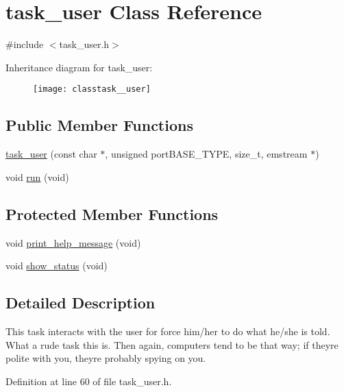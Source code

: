 \hypertarget{classtask__user}{}\section{task\+\_\+user Class Reference}
\label{classtask__user}


{\ttfamily \#include $<$task\+\_\+user.\+h$>$}

Inheritance diagram for task\+\_\+user\+:\begin{figure}[H]
\begin{center}
\leavevmode
\texttt{[image: classtask\_\_user]}
\end{center}
\end{figure}
\subsection*{Public Member Functions}
\begin{DoxyCompactItemize}
\item 
\hyperlink{classtask__user_a3aba77563b375bb14838800608da48bc}{task\+\_\+user} (const char $\ast$, unsigned port\+B\+A\+S\+E\+\_\+\+T\+Y\+PE, size\+\_\+t, emstream $\ast$)
\item 
void \hyperlink{classtask__user_adca6429d57be25e8d411414fc8ad75af}{run} (void)
\end{DoxyCompactItemize}
\subsection*{Protected Member Functions}
\begin{DoxyCompactItemize}
\item 
void \hyperlink{classtask__user_a75475060f83bae1e44bcc8a5c34015c7}{print\+\_\+help\+\_\+message} (void)
\item 
void \hyperlink{classtask__user_a105bebbd9cb1031154c3dfc3662db4a0}{show\+\_\+status} (void)
\end{DoxyCompactItemize}


\subsection{Detailed Description}
This task interacts with the user for force him/her to do what he/she is told. What a rude task this is. Then again, computers tend to be that way; if they\textquotesingle{}re polite with you, they\textquotesingle{}re probably spying on you. 

Definition at line 60 of file task\+\_\+user.\+h.



